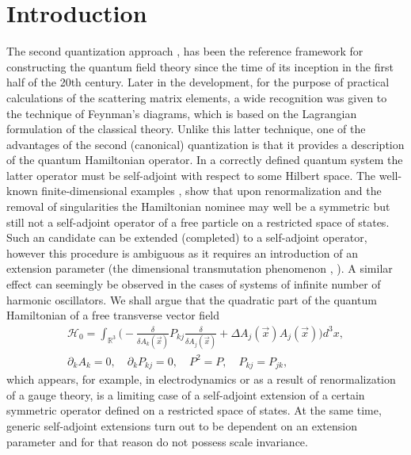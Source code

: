 \documentclass[12pt]{article}
\newcommand{\HH}{\mathscr{H}}
\newcommand{\RR}{\mathbb{R}}
\begin{document}
\section*{Introduction}
	The second quantization approach
\cite{Dirac}, \cite{Becchi}
	has been the reference framework for constructing the quantum field theory
	since the time of its inception in the first half of the 20th century.
	Later in the development, for the purpose of practical calculations
	of the scattering matrix elements, a wide recognition was given
	to the technique of Feynman's diagrams,
        which is based on the Lagrangian formulation of the classical theory.
	Unlike this latter technique, one of the advantages of the second (canonical) quantization
	is that it provides a description of the quantum Hamiltonian operator.
	In a correctly defined quantum system the latter operator must be
	self-adjoint with respect to some Hilbert space.
	The well-known finite-dimensional examples 
\cite{BF},
\cite{Jackiw}
	show that upon renormalization and the removal of singularities
	the Hamiltonian nominee may well be a symmetric but still not a self-adjoint operator
	of a free particle on a restricted space of states.
	Such an candidate can be extended (completed) to a self-adjoint operator,
	however this procedure is ambiguous as it requires an introduction of an extension parameter
	(the dimensional transmutation phenomenon
\cite{Jackiw},
\cite{LFres}).
	A similar effect can seemingly be observed in the cases of systems of infinite number
	of harmonic oscillators.
	We shall argue that the quadratic part of the quantum Hamiltonian of a free transverse vector field
\begin{gather*}
    \HH_{0} = \int_{\RR^{3}} \bigl(-\frac{\delta}{\delta A_{k}(\vec{x})}
	P_{kj} \frac{\delta}{\delta A_{j}(\vec{x})}
	+ \Delta A_{j}(\vec{x}) A_{j}(\vec{x}) \bigr)d^{3}x, \\
    \partial_{k} A_{k} = 0,\quad
    \partial_{k} P_{kj} =0, \quad P^{2}=P, \quad P_{kj} = P_{jk},
\end{gather*}
	which appears, for example, in electrodynamics or as a result of renormalization
	of a gauge theory, is a limiting case of a self-adjoint extension of a certain
	symmetric operator defined on a restricted space of states.
	At the same time, generic self-adjoint extensions turn out to be dependent
	on an extension parameter and for that reason do not possess scale invariance.
\end{document}
